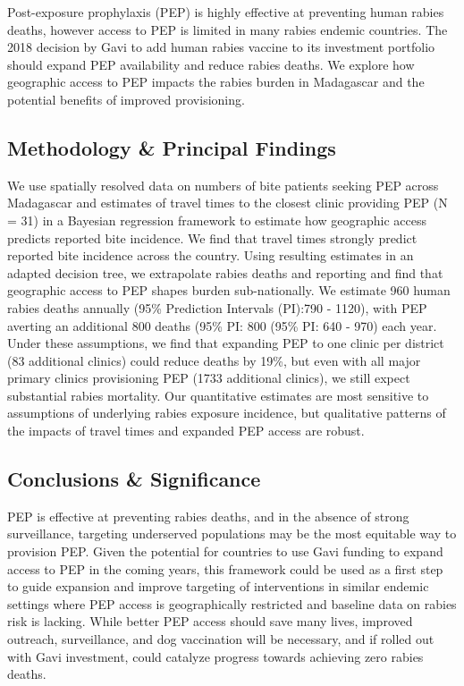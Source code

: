 \documentclass[
]{book}
\begin{document}
Post-exposure prophylaxis (PEP) is highly effective at preventing human
rabies deaths, however access to PEP is limited in many rabies endemic
countries. The 2018 decision by Gavi to add human rabies vaccine to its
investment portfolio should expand PEP availability and reduce rabies
deaths. We explore how geographic access to PEP impacts the rabies
burden in Madagascar and the potential benefits of improved
provisioning.

\hypertarget{methodology-principal-findings}{%
\subsection*{Methodology \& Principal Findings}\label{methodology-principal-findings}}

We use spatially resolved data on numbers of bite patients seeking PEP
across Madagascar and estimates of travel times to the closest clinic
providing PEP (N = 31) in a Bayesian regression framework to estimate
how geographic access predicts reported bite incidence. We find that
travel times strongly predict reported bite incidence across the
country. Using resulting estimates in an adapted decision tree, we
extrapolate rabies deaths and reporting and find that geographic access
to PEP shapes burden sub-nationally. We estimate 960 human rabies deaths
annually (95\% Prediction Intervals (PI):790 - 1120), with PEP averting
an additional 800 deaths (95\% PI: 800 (95\% PI: 640 - 970) each year.
Under these assumptions, we find that expanding PEP to one clinic per
district (83 additional clinics) could reduce deaths by 19\%, but even
with all major primary clinics provisioning PEP (1733 additional
clinics), we still expect substantial rabies mortality. Our quantitative
estimates are most sensitive to assumptions of underlying rabies
exposure incidence, but qualitative patterns of the impacts of travel
times and expanded PEP access are robust.

\hypertarget{conclusions-significance}{%
\subsection*{Conclusions \& Significance}\label{conclusions-significance}}

PEP is effective at preventing rabies deaths, and in the absence of
strong surveillance, targeting underserved populations may be the most
equitable way to provision PEP. Given the potential for countries to use
Gavi funding to expand access to PEP in the coming years, this framework
could be used as a first step to guide expansion and improve targeting
of interventions in similar endemic settings where PEP access is
geographically restricted and baseline data on rabies risk is lacking.
While better PEP access should save many lives, improved outreach,
surveillance, and dog vaccination will be necessary, and if rolled out
with Gavi investment, could catalyze progress towards achieving zero
rabies deaths.
\end{document}
